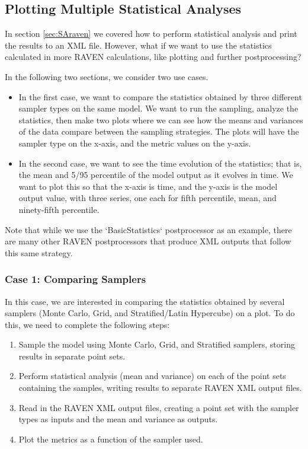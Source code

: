 \subsection{Plotting Multiple Statistical Analyses}
In section \ref{sec:SAraven} we covered how to perform statistical analysis and print the results to an XML
file.  However, what if we want to use the statistics calculated in more RAVEN calculations, like plotting and
further postprocessing?

In the following two sections, we consider two use cases.
\begin{itemize}
  \item In the first case, we want to compare the statistics obtained by three different sampler types on the
    same model. We want to run the sampling, analyze the statistics, then make two plots where we can see how
    the means and variances of the data compare between the sampling strategies.  The plots will have the
    sampler type on the x-axis, and the metric values on the y-axis.
  \item In the second case, we want to see the time evolution of the statistics; that is, the mean and 5/95
    percentile of the model output as it evolves in time.  We want to plot this so that the x-axis is time,
    and the y-axis is the model output value, with three series, one each for fifth percentile, mean, and
    ninety-fifth percentile.
\end{itemize}

Note that while we use the `BasicStatistics` postprocessor as an example, there are many other RAVEN
postprocessors that produce XML outputs that follow this same strategy.

\subsubsection{Case 1: Comparing Samplers}
In this case, we are interested in comparing the statistics obtained by several samplers (Monte Carlo, Grid,
and Stratified/Latin Hypercube) on a plot.  To do
this, we need to complete the following steps:
\begin{enumerate}
  \item Sample the model using Monte Carlo, Grid, and Stratified samplers, storing results in separate point
    sets.
  \item Perform statistical analysis (mean and variance) on each of the point sets containing the samples, writing results to
    separate RAVEN XML output files.
  \item Read in the RAVEN XML output files, creating a point set with the sampler types as inputs and the mean
    and variance as outputs.
  \item Plot the metrics as a function of the sampler used.
\end{enumerate}

